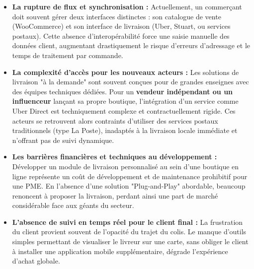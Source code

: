 \begin{itemize}
    \item \textbf{La rupture de flux et synchronisation :} Actuellement, un commerçant doit souvent gérer deux interfaces distinctes : son catalogue de vente (WooCommerce) et son interface de livraison (Uber, Stuart, ou services postaux). Cette absence d'interopérabilité force une saisie manuelle des données client, augmentant drastiquement le risque d'erreurs d'adressage et le temps de traitement par commande.
    
    \item \textbf{La complexité d'accès pour les nouveaux acteurs :} Les solutions de livraison "à la demande" sont souvent conçues pour de grandes enseignes avec des équipes techniques dédiées. Pour un \textbf{vendeur indépendant ou un influenceur} lançant sa propre boutique, l'intégration d'un service comme Uber Direct est techniquement complexe et contractuellement rigide. Ces acteurs se retrouvent alors contraints d'utiliser des services postaux traditionnels (type La Poste), inadaptés à la livraison locale immédiate et n'offrant pas de suivi dynamique.

    \item \textbf{Les barrières financières et techniques au développement :} Développer un module de livraison personnalisé au sein d'une boutique en ligne représente un coût de développement et de maintenance prohibitif pour une PME. En l'absence d'une solution "Plug-and-Play" abordable, beaucoup renoncent à proposer la livraison, perdant ainsi une part de marché considérable face aux géants du secteur.

    \item \textbf{L'absence de suivi en temps réel pour le client final :} La frustration du client provient souvent de l'opacité du trajet du colis. Le manque d'outils simples permettant de visualiser le livreur sur une carte, sans obliger le client à installer une application mobile supplémentaire, dégrade l'expérience d'achat globale.
\end{itemize}
